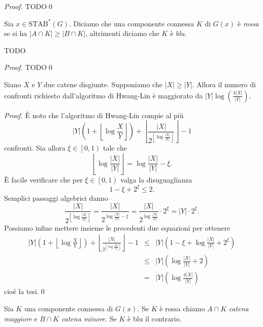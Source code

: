 \begin{proof}
	TODO\qed 
\end{proof}
\begin{definition}
	Sia \(x\in\text{STAB}^{*}(G)\). Diciamo che una componente connessa \(K\) di \(G(x)\) è \emph{rossa} se si ha \(|A\cap K|\ge|B\cap K|\), altrimenti diciamo che \(K\) è \emph{blu}. 
\end{definition}
\begin{lemma}
	\label{consistentlemma} TODO 
\end{lemma}
\begin{proof}
	TODO\qed 
\end{proof}
\begin{lemma}
	\label{hwanglinlemma} Siano \(X\) e \(Y\) due catene disgiunte. Supponiamo che \(|X|\ge|Y|\). Allora il numero di confronti richiesto dall'algoritmo di Hwang-Lin è maggiorato da \(|Y|\log(\frac{4|X|}{|Y|})\). 
\end{lemma}
\begin{proof}
	È noto che l'algoritmo di Hwang-Lin compie al più
	\[|Y|\left(1+\left\lfloor{\log{\frac{X}{Y}}}\right\rfloor\right)+\left\lfloor\frac{|X|}{2^{\left\lfloor\log{\frac{|X|}{|Y|}}\right\rfloor}}\right\rfloor-1\]
	confronti. Sia allora \(\xi\in\left[0,1\right)\) tale che
	\[\left\lfloor\log{\frac{|X|}{|Y|}}\right\rfloor=\log{\frac{|X|}{|Y|}}-\xi.\]
	È facile verificare che per \(\xi\in\left[0,1\right)\) valga la disuguaglianza
	\[1-\xi+2^{\xi}\le 2.\]
	Semplici passaggi algebrici danno
	\[\frac{|X|}{2^{\left\lfloor\log{\frac{|X|}{|Y|}}\right\rfloor}}=\frac{|X|}{2^{\log{\frac{|X|}{|Y|}}-\xi}}=\frac{|X|}{2^{\log{\frac{|X|}{|Y|}}}}\cdot 2^{\xi}=|Y|\cdot 2^{\xi}.\]
	Possiamo infine mettere insieme le precedenti due equazioni per ottenere 
	\begin{eqnarray}
		|Y|\left(1+\left\lfloor{\log{\frac{X}{Y}}}\right\rfloor\right)+\left\lfloor\frac{|X|}{2^{\left\lfloor\log{\frac{|X|}{|Y|}}\right\rfloor}}\right\rfloor-1&\le&|Y|\left(1-\xi+\log{\frac{|X|}{|Y|}}+2^{\xi}\right) \nonumber \\
		&\le& |Y|\left(\log{\frac{|X|}{|Y|}}+2\right) \nonumber \\
		&=& |Y|\left(\log{\frac{4|X|}{|Y|}}\right) \nonumber 
	\end{eqnarray}
	cioé la tesi.\qed 
\end{proof}
\begin{definition}
	Sia \(K\) una componente connessa di \(G(x)\). Se \(K\) è rossa chiamo \(A\cap K\) \emph{catena maggiore} e \(B\cap K\) \emph{catena minore}. Se \(K\) è blu il contrario. 
\end{definition}
